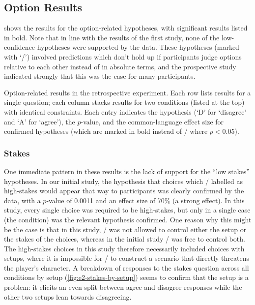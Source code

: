 \subsection{Option Results}

 shows the results for the option-related hypotheses, with significant results listed in bold.
%
Note that in line with the results of the first study, none of the low-confidence hypotheses were supported by the data.
%
These hypotheses (marked with `\lc/') involved predictions which don't hold up if participants judge options relative to each other instead of in absolute terms, and the prospective study indicated strongly that this was the case for many participants.

\begin{table}[!t]
\centering
\bgroup
\def\arraystretch{1.3}
\setlength{\tabcolsep}{0.4em}

\egroup
\caption[Retrospective option results]{Option-related results in the retrospective experiment. Each row lists results for a single question; each column stacks results for two conditions (listed at the top) with identical  constraints. Each entry indicates the hypothesis (`D' for `disagree' and `A' for `agree'), the $p$-value, and the common-language effect size for confirmed hypotheses (which are marked in bold instead of \nsighcolor/ where $p < 0.05$).} %
  \label{tab:e2-option-results}
\end{table}


\subsubsection{Stakes}
One immediate pattern in these results is the lack of support for the ``low stakes'' hypotheses.
%
In our initial study, the hypothesis that choices which \dunyazad/ labelled as high-stakes would appear that way to participants was clearly confirmed by the data, with a $p$-value of 0.0011 and an effect size of 70\% (a strong effect).
%
In this study, every single choice was required to be high-stakes, but only in a single case (the \unxs{} condition) was the relevant hypothesis confirmed.
%
One reason why this might be the case is that in this study, \dunyazad/ was not allowed to control either the setup or the stakes of the choices, whereas in the initial study \dunyazad/ was free to control both.
%
The high-stakes choices in this study therefore necessarily included choices with  setups, where it is impossible for \dunyazad/ to construct a scenario that directly threatens the player's character.
%
A breakdown of responses to the stakes question across all conditions by setup (\cref{fig:e2-stakes-by-setup}) seems to confirm that the  setup is a problem: it elicits an even split between agree and disagree responses while the other two setups lean towards disagreeing.


